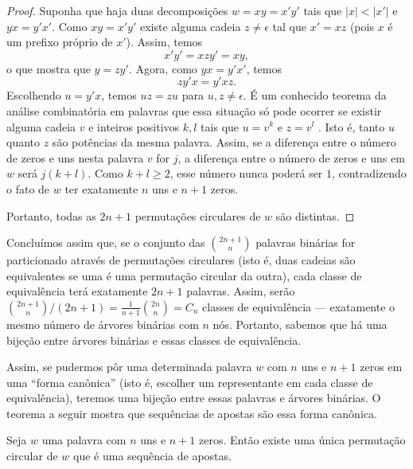 \begin{proof}
    Suponha que haja duas decomposições $w = xy = x'y'$
    tais que $|x| < |x'|$ e $yx = y'x'$.
    Como $xy = x'y'$
    existe alguma cadeia $z \neq \epsilon$
    tal que $x' = xz$
    (pois $x$ é um prefixo próprio de $x'$).
    Assim, temos
    \begin{equation*}
        x'y' = xzy' = xy,
    \end{equation*}
    o que mostra que $y = zy'$.
    Agora,
    como $yx = y'x'$,
    temos
    \begin{equation*}
        zy'x = y'xz.
    \end{equation*}
    Escolhendo $u = y'x$, temos $uz = zu$
    para $u, z \neq \epsilon$.
    É um conhecido teorema da análise combinatória em palavras
    que essa situação só pode ocorrer se
    existir alguma cadeia $v$ e inteiros positivos $k, l$ tais que
    $u = v^k$ e $z = v^l$ \cite[p.~32]{Shallit2008}.
    Isto é, tanto $u$ quanto $z$ são potências da mesma palavra.
    Assim,
    se a diferença entre o número de zeros e uns nesta palavra $v$ for $j$,
    a diferença entre o número de zeros e uns em $w$ será $j(k + l)$.
    Como $k + l \geq 2$,
    esse número nunca poderá ser $1$,
    contradizendo o fato de $w$ ter exatamente $n$ uns e $n+1$ zeros.

    Portanto, todas as $2n+1$ permutações circulares de $w$ são distintas.
\end{proof}

Concluímos assim que,
se o conjunto das $\binom{2n+1}{n}$ palavras binárias
for particionado através de permutações circulares
(isto é, duas cadeias são equivalentes se uma é uma permutação circular da outra),
cada classe de equivalência terá exatamente $2n+1$ palavras.
Assim,
serão $\binom{2n+1}{n}/(2n+1) = \frac{1}{n+1} \binom{2n}{n} = C_n$
classes de equivalência
--- exatamente o mesmo número de árvores binárias com $n$ nós.
Portanto,
sabemos que há uma bijeção entre árvores binárias e essas classes de equivalência.

Assim,
se pudermos pôr uma determinada palavra $w$ com $n$ uns e $n+1$ zeros
em uma ``forma canônica''
(isto é, escolher um representante em cada classe de equivalência),
teremos uma bijeção entre essas palavras e árvores binárias.
O teorema a seguir mostra que
sequências de apostas são essa forma canônica.

\begin{lemma}
    Seja $w$ uma palavra com $n$ uns e $n+1$ zeros.
    Então existe uma única permutação circular de $w$
    que é uma sequência de apostas.
\end{lemma}

